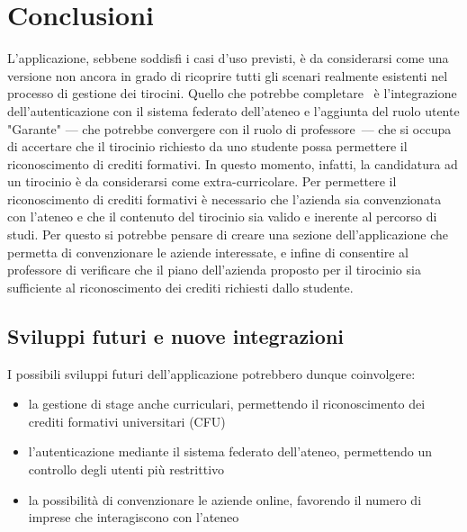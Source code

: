 \chapter{Conclusioni}

L'applicazione, sebbene soddisfi i casi d'uso previsti, è da considerarsi come una versione non ancora in grado di ricoprire tutti gli scenari realmente esistenti nel processo di gestione dei tirocini. Quello che potrebbe completare \projectName~è l'integrazione dell'autenticazione con il sistema federato dell'ateneo e l'aggiunta del ruolo utente "Garante"  --- che potrebbe convergere con il ruolo di professore~--- che si occupa di accertare che il tirocinio richiesto da uno studente possa permettere il riconoscimento di crediti formativi. In questo momento, infatti, la candidatura ad un tirocinio è da considerarsi come extra-curricolare. 
%
Per permettere il riconoscimento di crediti formativi è necessario che l'azienda sia convenzionata con l'ateneo e che il contenuto del tirocinio sia valido e inerente al percorso di studi. Per questo si potrebbe pensare di creare una sezione dell'applicazione che permetta di convenzionare le aziende interessate, e infine di consentire al professore di verificare che il piano dell'azienda proposto per il tirocinio sia sufficiente al riconoscimento dei crediti richiesti dallo studente.

\section{Sviluppi futuri e nuove integrazioni}
I possibili sviluppi futuri dell'applicazione potrebbero dunque coinvolgere:
\begin{itemize}
	\item la gestione di stage anche curriculari, permettendo il riconoscimento dei crediti formativi universitari (CFU)
	\item l'autenticazione mediante il sistema federato dell'ateneo, permettendo un controllo degli utenti più restrittivo
	\item la possibilità di convenzionare le aziende online, favorendo il numero di imprese che interagiscono con l'ateneo
\end{itemize}
